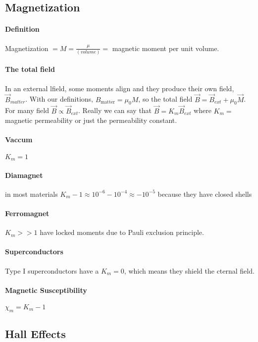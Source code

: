 \documentclass{article}
\begin{document}
    \subsection{Magnetization}
    \paragraph{Definition} Magnetization $ = M = \frac{\mu}{(volume)} = $ magnetic moment per unit volume. 
    \paragraph{The total field}In an external lfield, some moments align and they produce their own field, $\vec{B}_{matter}$.
    With our definitions, $B_{\text{matter}} = \mu_0 M$, so the total field $\vec{B} = \vec{B}_{ext} + \mu_0\vec{M}$. 
    For many field $\vec{B} \propto \vec{B}_{ext}$. 
    Really we can say that $\vec{B} = K_m \vec{B}_{ext}$ where $K_m = $ magnetic permeability or just the permeability constant.
    \paragraph{Vaccum} $K_m = 1$ 
    \paragraph{Diamagnet} in most materials $K_m - 1 \approx 10^{-6} - 10^{-4} \approx -10^{-5}$ because they have closed shells
    \paragraph{Ferromagnet} $K_m >> 1$ have locked moments due to Pauli exclusion principle. 
    \paragraph{Superconductors} Type I superconductors have a $K_m = 0$, which means they shield the cternal field.
    \paragraph{Magnetic Susceptibility} $\chi_m = K_m - 1$ 
    
    \subsection{Hall Effects}
\end{document}
